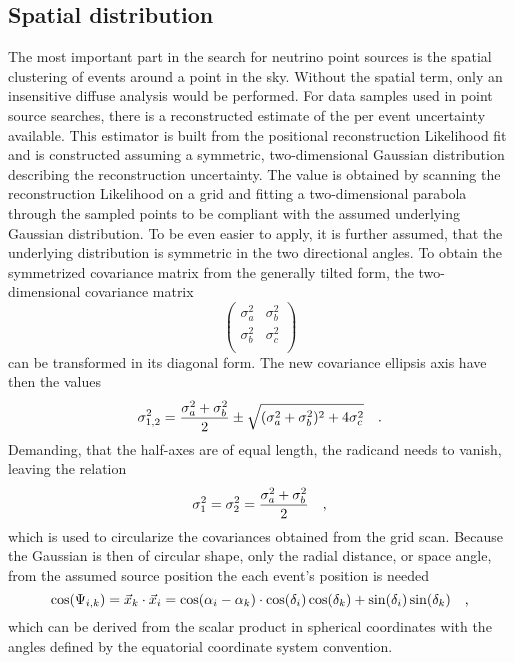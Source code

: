 \subsection{Spatial distribution}
  \label{chp:pointsource_signal_pdf}
The most important part in the search for neutrino point sources is the spatial clustering of events around a point in the sky.
Without the spatial term, only an insensitive diffuse analysis would be performed.
For data samples used in point source searches, there is a reconstructed estimate of the per event uncertainty available.
This estimator is built from the positional reconstruction Likelihood fit and is constructed assuming a symmetric, two-dimensional Gaussian distribution describing the reconstruction uncertainty.
The value is obtained by scanning the reconstruction Likelihood on a grid and fitting a two-dimensional parabola through the sampled points to be compliant with the assumed underlying Gaussian distribution.
To be even easier to apply, it is further assumed, that the underlying distribution is symmetric in the two directional angles.
To obtain the symmetrized covariance matrix from the generally tilted form, the two-dimensional covariance matrix
\begin{equation}
  \begin{pmatrix}
    \sigma_a^2 & \sigma_b^2 \\
    \sigma_b^2 & \sigma_c^2 \\
  \end{pmatrix}
\end{equation}
can be transformed in its diagonal form.
The new covariance ellipsis axis have then the values
\begin{equation}
  \sigma_{1,2}^2 = \frac{\sigma_a^2+\sigma_b^2}{2} \pm
    \sqrt{(\sigma_a^2 + \sigma_b^2)^2 + 4\sigma_c^2}
  \quad\text{.}
\end{equation}
Demanding, that the half-axes are of equal length, the radicand needs to vanish, leaving the relation
\begin{equation}
  \sigma_1^2 = \sigma_2^2 = \frac{\sigma_a^2+\sigma_b^2}{2}
  \quad\text{,}
\end{equation}
which is used to circularize the covariances obtained from the grid scan.
Because the Gaussian is then of circular shape, only the radial distance, or space angle, from the assumed source position the each event's position is needed
\begin{equation}
  \cos(\Psi_{i,k})
  = \vec{x}_k \cdot \vec{x}_i
  = \cos(\alpha_i - \alpha_k) \cdot
    \cos(\delta_i)\cos(\delta_k) +
    \sin(\delta_i)\sin(\delta_k)
  \quad\text{,}
\end{equation}
which can be derived from the scalar product in spherical coordinates with the angles defined by the equatorial coordinate system convention.

